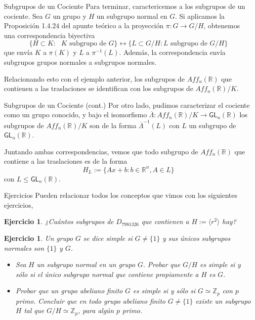 \documentclass{beamer}
\def\Z{\mathbb{Z}}
\def\R{\mathbb{R}}
\newtheorem{ejercicio}[teorema]{Ejercicio}
\begin{document}
\begin{frame}{Subgrupos de un Cociente}
Para terminar, caractericemos a los subgrupos de un cociente. Sea $G$ un grupo y $H$ un subgrupo normal en $G$. Si aplicamos la Proposición 1.4.24 del apunte teórico a la proyección $\pi : G \to G/H$, obtenemos una correspondencia biyectiva
\[
\{H \subset K : \text{ $K$ subgrupo de $G$}\} \leftrightarrow \{L \subset G/H : \text{$L$ subgrupo de $G/H$}\}
\]
que envía $K$ a $\pi(K)$ y $L$ a $\pi^{-1}(L)$. Además, la correspondencia envía subgrupos grupos normales a subgrupos normales.
\medskip

 Relacionando esto con el ejemplo anterior, los subgrupos de $Aff_n(\R)$ que contienen a las traslaciones se identifican con los subgrupos de $Aff_n(\R)/K$.
\end{frame}

\begin{frame}{Subgrupos de un Cociente (cont.)}
Por otro lado, pudimos caracterizar el cociente como un grupo conocido, y bajo el isomorfismo $\overline{\Lambda} : Aff_n(\R)/K \to \mathsf{GL}_n(\R)$ los subgrupos de $Aff_n(\R)/K$ son de la forma $\overline{\Lambda}^{-1}(L)$ con $L$ un subgrupo de $\mathsf{GL}_n(\R)$. 
\medskip

 Juntando ambas correspondencias, vemos que todo subgrupo de $Aff_n(\R)$ que contiene a las traslaciones es de la forma
\[
H_L := \{Ax+b : b\in \R^n, A \in L\}
\]
con $L \leq \mathsf{GL}_n(\R)$.
\end{frame}

\begin{frame}{Ejercicios}
Pueden relacionar todos los conceptos que vimos con los siguientes ejercicios,

\begin{ejercicio} ¿Cuántos subgrupos de $D_{7981326}$ que contienen a $H := \langle r^2 \rangle$ hay?
\end{ejercicio}

\begin{ejercicio} Un grupo $G$ se dice \alert{simple} si $G \neq \{1\}$ y sus únicos subgrupos normales son $\{1\}$ y $G$. 
\begin{itemize}
\item[(i)] Sea $H$ un subgrupo normal en un grupo $G$. Probar que $G/H$ es simple si y sólo si el único subgrupo normal que contiene propiamente a $H$ es $G$.
\item[(ii)] Probar que un grupo abeliano finito $G$ es simple si y sólo si $G \simeq \Z_p$ con $p$ primo. Concluir que en todo grupo abeliano finito  $G \neq \{1\}$ existe un subgrupo $H$ tal que $G/H \simeq \Z_p$, para algún $p$ primo.
\end{itemize}
\end{ejercicio}
\end{frame}
 
\end{document}
